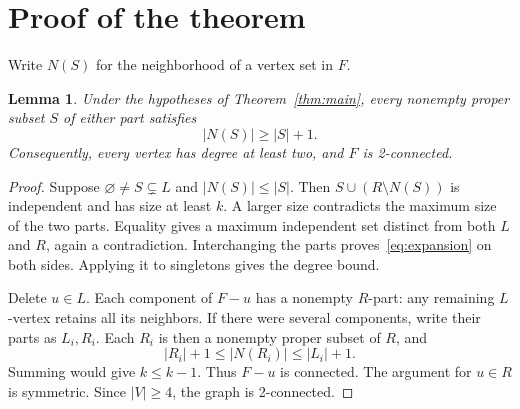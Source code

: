 \documentclass[11pt]{article}
\newtheorem{lemma}[theorem]{Lemma}
\begin{document}
\section{Proof of the theorem}

Write $N(S)$ for the neighborhood of a vertex set in $F$.

\begin{lemma}\label{lem:expansion}
Under the hypotheses of Theorem~\ref{thm:main}, every nonempty proper
subset $S$ of either part satisfies
\begin{equation}\label{eq:expansion}
 |N(S)|\ge |S|+1.
\end{equation}
Consequently, every vertex has degree at least two, and $F$ is 2-connected.
\end{lemma}
\begin{proof}
Suppose $\varnothing\ne S\subsetneq L$ and $|N(S)|\le |S|$.
Then $S\cup(R\setminus N(S))$ is independent and has size at least $k$.
A larger size contradicts the maximum size of the two parts. Equality gives
a maximum independent set distinct from both $L$ and $R$, again a
contradiction. Interchanging the parts proves~\eqref{eq:expansion} on
both sides. Applying it to singletons gives the degree bound.

Delete $u\in L$. Each component of $F-u$ has a nonempty $R$-part:
any remaining $L$-vertex retains all its neighbors. If there were several
components, write their parts as $L_i,R_i$. Each $R_i$ is then a nonempty
proper subset of $R$, and
\[
 |R_i|+1\le |N(R_i)|\le |L_i|+1.
\]
Summing would give $k\le k-1$. Thus $F-u$ is connected. The argument
for $u\in R$ is symmetric. Since $|V|\ge4$, the graph is 2-connected.
\end{proof}
\end{document}
